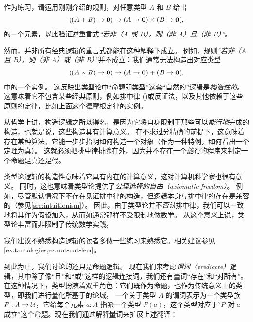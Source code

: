 作为练习，请运用刚刚介绍的规则，对任意类型 $A$ 和 $B$ 给出 \[ ((A + B) \to \mathbf{0}) \to (A \to \mathbf{0}) \times (B \to \mathbf{0}), \] 的一个元素，以此验证逆重言式\emph{``若非（$A$ 或 $B$），则（非 $A$）且（非 $B$）''}。

然而，并非所有经典逻辑的重言式都能在这种解释下成立。
例如，规则\emph{``若非（$A$ 且 $B$），则（非 $A$）或（非 $B$）''}并不成立：我们通常无法构造出对应类型
\[ ((A \times B) \to \mathbf{0}) \to (A \to \mathbf{0}) + (B \to \mathbf{0}).\]
中的一个实例。
这反映出类型论中``命题即类型''这套``自然的''逻辑是\emph{构造性的}。
这意味着它不包含某些经典原则，例如排中律 (\LEM{})或反证法，以及其他依赖于这些原则的定律，比如上面这个德摩根定律的实例。
%
%

从哲学上讲，构造逻辑之所以得名，是因为它将自身限制于那些可以\emph{能行地}完成的构造，也就是说，这些构造具有计算意义。
在不求过分精确的前提下，这意味着存在某种算法，它能一步步指明如何构造一个对象（作为一种特例，如何看出一个定理为真）。
这就必须把排中律排除在外，因为并不存在一个\emph{能行}的程序来判定一个命题是真还是假。

类型论逻辑的构造性意味着它具有内在的计算意义，这对计算机科学家也很有意义。
同时，这也意味着类型论提供了\emph{公理选择的自由（axiomatic freedom）}。
例如，尽管默认情况下不存在见证排中律的构造，但逻辑本身与排中律的存在是兼容的（参见\cref{sec:intuitionism}）。
因此，由于类型论并不\emph{否认}排中律，我们可以一致地将其作为假设加入，从而如通常那样不受限制地做数学。
从这个意义上说，类型论丰富而非限制了传统数学实践。

我们建议不熟悉构造逻辑的读者多做一些练习来熟悉它。相关建议参见\cref{ex:tautologies,ex:not-not-lem}。

\mentalpause

到此为止，我们讨论的还只是命题逻辑。
%
%
%
%
%
现在我们来考虑\emph{谓词（predicate）}逻辑，其中除了像``且''和``或''这样的逻辑连接词，我们还有量词``存在''和``对所有''。
在这种情况下，类型扮演着双重角色：它们既作为命题，也作为传统意义上的类型，即我们进行量化所基于的论域。
一个关于类型 $A$ 的谓词表示为一个类型族 $P : A \to \mathcal{U}$，它给每个元素 $a : A$ 指派一个类型 $P(a)$，这个类型对应于``$P$ 对 $a$ 成立''这个命题。现在我们通过解释量词来扩展上述翻译：

